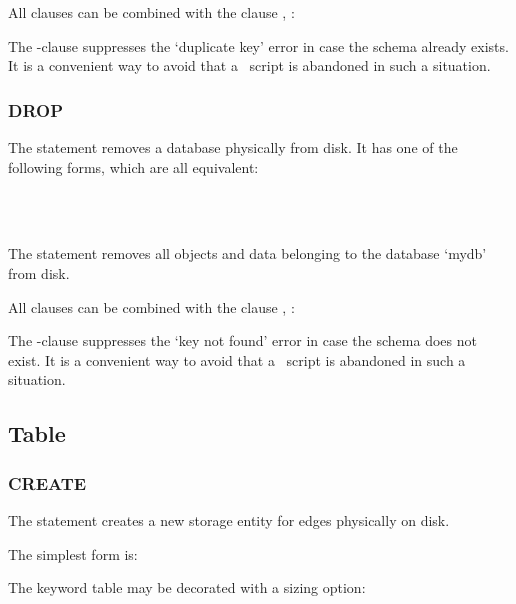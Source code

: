 All  clauses can be combined
with the clause , \eg:

  

The -clause
suppresses the `duplicate key' error
in case the schema
already exists.
It is a convenient way to avoid
that a \sql\ script is abandoned
in such a situation.

\subsubsection{DROP}
The  statement
removes a database physically from disk.
It has one of the following forms,
which are all equivalent:

 \\
 \\
 

The statement removes all objects and data
belonging to the database `mydb' from disk.

All  clauses can be combined
with the clause , \eg:

  

The -clause
suppresses the `key not found' error
in case the schema
does not exist.
It is a convenient way to avoid
that a \sql\ script is abandoned
in such a situation.


\subsection{Table}
\subsubsection{CREATE}
The  statement
creates a new storage entity for edges
physically on disk.

The simplest form is:

 

The keyword table may be decorated
with a sizing option:

